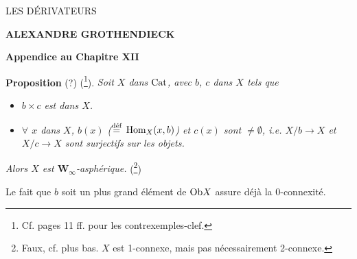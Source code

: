 \dgrchunkbegin

\printedpage{}

\begin{center}
{\LARGE\textsf{LES DÉRIVATEURS}}

\bigskip

\textbf{ALEXANDRE GROTHENDIECK}

\bigskip\bigskip

{\large\textbf{Appendice au Chapitre XII}}
\end{center}

\newpage


\textbf{Proposition} (?) (\footnote{Cf. pages 11 ff. pour les contrexemples-clef.}). \textit{Soit $X$ dans} $\Cat$\textit{, avec $b$, $c$ dans $X$ tels que}

\begin{itemize}
\item[\textit{a)}] \textit{$b\times c$ est dans $X$.}
\item[\textit{b)}] \textit{$\forall$ $x$ dans $X$, $b(x)$ ($\deq$} $\Hom_X(x,b)$\textit{) et $c(x)$ sont $\neq\emptyset$, i.e. $X/b \longrightarrow X$ et $X/c \longrightarrow X$ sont surjectifs sur les objets.}
\end{itemize}

\textit{Alors $X$ est $\mathbf{W}_\infty$-asphérique.} (\footnote{Faux, cf. plus bas. $X$ est 1-connexe, mais pas nécessairement 2-connexe.})

Le fait que $b$ soit un plus grand élément de $\Ob X$ assure déjà la 0-connexité.

